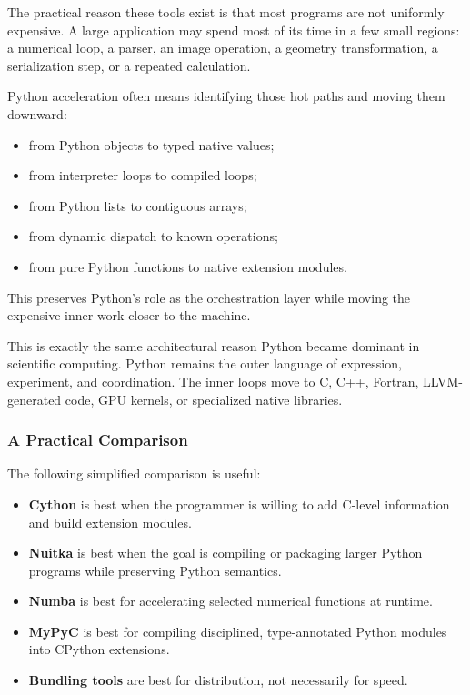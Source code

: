 The practical reason these tools exist is that most programs are not uniformly expensive. A large application may spend most of its time in a few small regions: a numerical loop, a parser, an image operation, a geometry transformation, a serialization step, or a repeated calculation.

Python acceleration often means identifying those hot paths and moving them downward:

\begin{itemize}
    \item from Python objects to typed native values;
    \item from interpreter loops to compiled loops;
    \item from Python lists to contiguous arrays;
    \item from dynamic dispatch to known operations;
    \item from pure Python functions to native extension modules.
\end{itemize}

This preserves Python's role as the orchestration layer while moving the expensive inner work closer to the machine.

This is exactly the same architectural reason Python became dominant in scientific computing. Python remains the outer language of expression, experiment, and coordination. The inner loops move to C, C++, Fortran, LLVM-generated code, GPU kernels, or specialized native libraries.

\subsubsection{A Practical Comparison}

The following simplified comparison is useful:

\begin{itemize}
    \item \textbf{Cython} is best when the programmer is willing to add C-level information and build extension modules.
    \item \textbf{Nuitka} is best when the goal is compiling or packaging larger Python programs while preserving Python semantics.
    \item \textbf{Numba} is best for accelerating selected numerical functions at runtime.
    \item \textbf{MyPyC} is best for compiling disciplined, type-annotated Python modules into CPython extensions.
    \item \textbf{Bundling tools} are best for distribution, not necessarily for speed.
\end{itemize}

